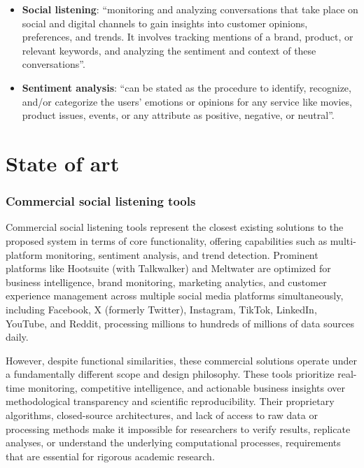 \begin{itemize}
	\item \textbf{Social listening}: \enquote{monitoring and analyzing conversations that take place on social and digital channels to gain insights into customer opinions, preferences, and trends. It involves tracking mentions of a brand, product, or relevant keywords, and analyzing the sentiment and context of these conversations}. \parencite{emplifi_sociallistening}

	\item \textbf{Sentiment analysis}: \enquote{can be stated as the procedure to identify, recognize, and/or categorize the users' emotions or opinions for any service like movies, product issues, events, or any attribute as positive, negative, or neutral}. \parencite{bordoloi2023sentiment}

\end{itemize}

\section{State of art}

\subsubsection{Commercial social listening tools}

Commercial social listening tools represent the closest existing solutions to the proposed system in terms of core functionality, offering capabilities such as multi-platform monitoring, sentiment analysis, and trend detection. Prominent platforms like Hootsuite (with Talkwalker) and Meltwater are optimized for business intelligence, brand monitoring, marketing analytics, and customer experience management across multiple social media platforms simultaneously, including Facebook, X (formerly Twitter), Instagram, TikTok, LinkedIn, YouTube, and Reddit, processing millions to hundreds of millions of data sources daily.

However, despite functional similarities, these commercial solutions operate under a fundamentally different scope and design philosophy. These tools prioritize real-time monitoring, competitive intelligence, and actionable business insights over methodological transparency and scientific reproducibility. Their proprietary algorithms, closed-source architectures, and lack of access to raw data or processing methods make it impossible for researchers to verify results, replicate analyses, or understand the underlying computational processes, requirements that are essential for rigorous academic research.

